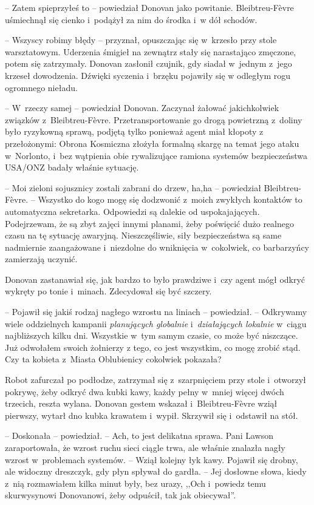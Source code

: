 \documentclass[oneside,polish,11pt,sfheadings]{mwbk}
\begin{document}
-- Zatem spieprzyłeś to -- powiedział Donovan jako powitanie.
Bleibtreu-Fèvre uśmiechnął się cienko i~podążył za nim do środka i~w dół
schodów.

-- Wszyscy robimy błędy -- przyznał, opuszczając się w~krzesło przy stole
warsztatowym. Uderzenia śmigieł na zewnątrz stały się narastająco
zmęczone, potem się zatrzymały. Donovan zasłonił czujnik, gdy siadał w~jednym z~jego krzeseł dowodzenia. Dźwięki syczenia i~brzęku pojawiły się
w odległym rogu ogromnego nieładu.

-- W~rzeczy samej -- powiedział Donovan. Zaczynał żałować jakichkolwiek
związków z~Bleibtreu-Fèvre. Przetransportowanie go drogą powietrzną z~doliny było ryzykowną sprawą, podjętą tylko ponieważ agent miał kłopoty
z przełożonymi: Obrona Kosmiczna złożyła formalną skargę na temat jego
ataku w~Norlonto, i~bez wątpienia obie rywalizujące ramiona systemów
bezpieczeństwa USA/ONZ badały właśnie sytuację.

-- Moi zieloni sojusznicy zostali zabrani do drzew, ha,ha -- powiedział
Bleibtreu-Fèvre. -- Wszystko do kogo mogę się dodzwonić z~moich zwykłych
kontaktów to automatyczna sekretarka. Odpowiedzi są dalekie od
uspokajających. Podejrzewam, że są zbyt zajęci innymi planami, żeby
poświęcić dużo realnego czasu na tę sytuację awaryjną. Nieszczęśliwie,
siły bezpieczeństwa są same nadmiernie zaangażowane i~niezdolne do
wniknięcia w~cokolwiek, co barbarzyńcy zamierzają uczynić.

Donovan zastanawiał się, jak bardzo to było prawdziwe i~czy agent mógł
odkryć wykręty po tonie i~minach. Zdecydował się być szczery.

-- Pojawił się jakiś rodzaj nagłego wzrostu na liniach -- powiedział. -- Odkrywamy wiele oddzielnych kampanii \emph{planujących globalnie} i~\emph{działających lokalnie} w~ciągu najbliższych kilku dni. Wszystkie w~tym samym czasie, co może być niszczące. Już odwołałem swoich żołnierzy
z tego, co jest wszystkim, co mogę zrobić stąd. Czy ta kobieta z~Miasta
Oblubienicy cokolwiek pokazała?

Robot zafurczał po podłodze, zatrzymał się z~szarpnięciem przy stole i~otworzył pokrywę, żeby odkryć dwa kubki kawy, każdy pełny w~mniej więcej
dwóch trzecich, reszta wylana. Donovan gestem wskazał i~Bleibtreu-Fèvre
wziął pierwszy, wytarł dno kubka krawatem i~wypił. Skrzywił się i~odstawił na stół.

-- Doskonała -- powiedział. -- Ach, to jest delikatna sprawa. Pani Lawson
zaraportowała, że wzrost ruchu sieci ciągle trwa, ale właśnie znalazła
nagły wzrost w~problemach systemów. -- Wziął kolejny łyk kawy. Pojawił
się drobny, ale widoczny dreszczyk, gdy płyn spływał do gardła. -- Jej
dosłowne słowa, kiedy z~nią rozmawiałem kilka minut były, bez urazy,
,,Och i~powiedz temu skurwysynowi Donovanowi, żeby odpuścił, tak jak
obiecywał''.
\end{document}
